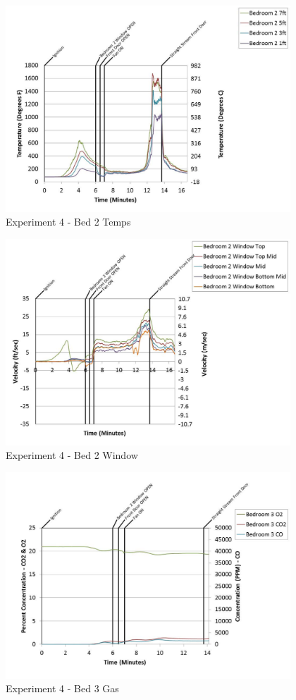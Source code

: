 \documentclass{article}
\begin{document}
\begin{appendices}
	\clearpage

	\begin{figure}[h!]
		\centering
		\includegraphics[height=3.05in]{0_Images/Results_Charts/Exp_4_Charts/Bed2Temps.pdf}
		\caption{Experiment 4 - Bed 2 Temps}
	\end{figure}
 

	\begin{figure}[h!]
		\centering
		\includegraphics[height=3.05in]{0_Images/Results_Charts/Exp_4_Charts/Bed2Window.pdf}
		\caption{Experiment 4 - Bed 2 Window}
	\end{figure}
 
	\clearpage

	\begin{figure}[h!]
		\centering
		\includegraphics[height=3.05in]{0_Images/Results_Charts/Exp_4_Charts/Bed3Gas.pdf}
		\caption{Experiment 4 - Bed 3 Gas}
	\end{figure}
 


\end{appendices}
\end{document}
